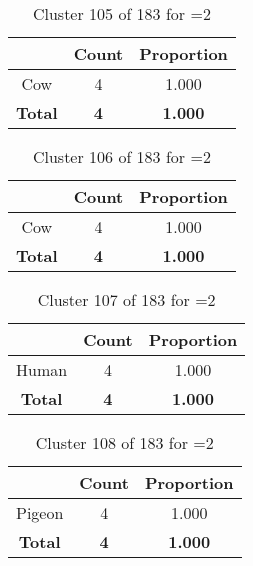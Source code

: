 \begin{table}[ht!]
\centering
\begin{tabular}{|c|c|c|}
\hline
\bf \Spec{} &\bf Count &\bf Proportion\\ \hline \hline
Cow & 4 & 1.000\\ \hline
\hline
\bf Total & \bf 4 & \bf 1.000\\ \hline
\end{tabular}
\label{tab:cluster:105:2}
\caption{Cluster 105 of 183 for \minneigh{}=2}
\end{table}

\begin{table}[ht!]
\centering
\begin{tabular}{|c|c|c|}
\hline
\bf \Spec{} &\bf Count &\bf Proportion\\ \hline \hline
Cow & 4 & 1.000\\ \hline
\hline
\bf Total & \bf 4 & \bf 1.000\\ \hline
\end{tabular}
\label{tab:cluster:106:2}
\caption{Cluster 106 of 183 for \minneigh{}=2}
\end{table}

\begin{table}[ht!]
\centering
\begin{tabular}{|c|c|c|}
\hline
\bf \Spec{} &\bf Count &\bf Proportion\\ \hline \hline
Human & 4 & 1.000\\ \hline
\hline
\bf Total & \bf 4 & \bf 1.000\\ \hline
\end{tabular}
\label{tab:cluster:107:2}
\caption{Cluster 107 of 183 for \minneigh{}=2}
\end{table}

\begin{table}[ht!]
\centering
\begin{tabular}{|c|c|c|}
\hline
\bf \Spec{} &\bf Count &\bf Proportion\\ \hline \hline
Pigeon & 4 & 1.000\\ \hline
\hline
\bf Total & \bf 4 & \bf 1.000\\ \hline
\end{tabular}
\label{tab:cluster:108:2}
\caption{Cluster 108 of 183 for \minneigh{}=2}
\end{table}


